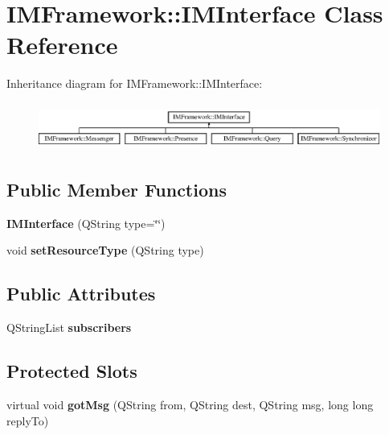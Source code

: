 \hypertarget{classIMFramework_1_1IMInterface}{
\section{IMFramework::IMInterface Class Reference}
\label{classIMFramework_1_1IMInterface}
}
Inheritance diagram for IMFramework::IMInterface:\begin{figure}[H]
\begin{center}
\leavevmode
\includegraphics[height=1.56425cm]{classIMFramework_1_1IMInterface}
\end{center}
\end{figure}
\subsection*{Public Member Functions}
\begin{DoxyCompactItemize}
\item 
\hypertarget{classIMFramework_1_1IMInterface_aa4356e86129844a13884416a74caf200}{
{\bfseries IMInterface} (QString type=\char`\"{}\char`\"{})}
\label{classIMFramework_1_1IMInterface_aa4356e86129844a13884416a74caf200}

\item 
\hypertarget{classIMFramework_1_1IMInterface_a0108afbbd4825d97a836e26b4b1b583a}{
void {\bfseries setResourceType} (QString type)}
\label{classIMFramework_1_1IMInterface_a0108afbbd4825d97a836e26b4b1b583a}

\end{DoxyCompactItemize}
\subsection*{Public Attributes}
\begin{DoxyCompactItemize}
\item 
\hypertarget{classIMFramework_1_1IMInterface_aa3c2fb5c152746ec7a24979cec5e7a3f}{
QStringList {\bfseries subscribers}}
\label{classIMFramework_1_1IMInterface_aa3c2fb5c152746ec7a24979cec5e7a3f}

\end{DoxyCompactItemize}
\subsection*{Protected Slots}
\begin{DoxyCompactItemize}
\item 
\hypertarget{classIMFramework_1_1IMInterface_a2c06b029f31cc5fbdd35de2e9b63fecc}{
virtual void {\bfseries gotMsg} (QString from, QString dest, QString msg, long long replyTo)}
\label{classIMFramework_1_1IMInterface_a2c06b029f31cc5fbdd35de2e9b63fecc}

\end{DoxyCompactItemize}
